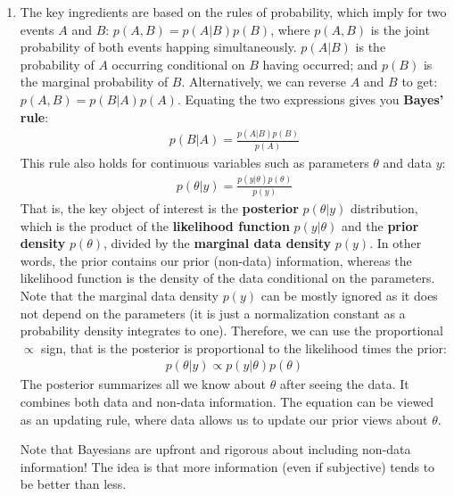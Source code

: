 \begin{enumerate}
\item The key ingredients are based on the rules of probability, which imply for two events \(A\) and \(B\):
  \(p(A,B)=p(A|B)p(B)\), where \(p(A,B)\) is the joint probability of both events happing simultaneously.
\(p(A|B)\) is the probability of \(A\) occurring conditional on \(B\) having occurred;
  and \(p(B)\) is the marginal probability of \(B\).
Alternatively, we can reverse \(A\) and \(B\) to get: \(p(A,B)=p(B|A)p(A)\).
Equating the two expressions gives you \textbf{Bayes' rule}:
\begin{align*}
p(B|A) = \frac{p(A|B)p(B)}{p(A)}
\end{align*}
This rule also holds for continuous variables such as parameters \(\theta \) and data \(y\):
\begin{align*}
p(\theta|y) = \frac{p(y|\theta)p(\theta)}{p(y)}
\end{align*}
That is, the key object of interest is the \textbf{posterior} \(p(\theta|y)\) distribution,
  which is the product of the \textbf{likelihood function} \(p(y|\theta)\) and the \textbf{prior density} \(p(\theta)\),
  divided by the \textbf{marginal data density} \(p(y)\).
In other words, the prior contains our prior (non-data) information,
  whereas the likelihood function is the density of the data conditional on the parameters.
Note that the marginal data density \(p(y)\) can be mostly ignored
  as it does not depend on the parameters
  (it is just a normalization constant as a probability density integrates to one).
Therefore, we can use the proportional \(\propto \) sign, that is the posterior is proportional to the likelihood times the prior:
\begin{align*}
p(\theta|y) \propto p(y|\theta) p(\theta)
\end{align*}
The posterior summarizes all we know about \(\theta \) after seeing the data.
It combines both data and non-data information.
The equation can be viewed as an updating rule,
  where data allows us to update our prior views about \(\theta \).

Note that Bayesians are upfront and rigorous about including non-data information!
The idea is that more information (even if subjective) tends to be better than less.


\end{enumerate}
